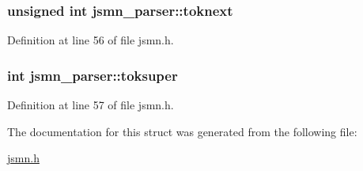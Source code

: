 \hypertarget{structjsmn__parser_af640efd7d154218124a964b65f114bff}{}
\subsubsection[{toknext}]{\setlength{\rightskip}{0pt plus 5cm}unsigned int jsmn\+\_\+parser\+::toknext}\label{structjsmn__parser_af640efd7d154218124a964b65f114bff}


Definition at line 56 of file jsmn.\+h.

\hypertarget{structjsmn__parser_af11fcec48d9f1298909777a12f1d1e39}{}
\subsubsection[{toksuper}]{\setlength{\rightskip}{0pt plus 5cm}int jsmn\+\_\+parser\+::toksuper}\label{structjsmn__parser_af11fcec48d9f1298909777a12f1d1e39}


Definition at line 57 of file jsmn.\+h.



The documentation for this struct was generated from the following file\+:\begin{DoxyCompactItemize}
\item 
\hyperlink{jsmn_8h}{jsmn.\+h}\end{DoxyCompactItemize}
